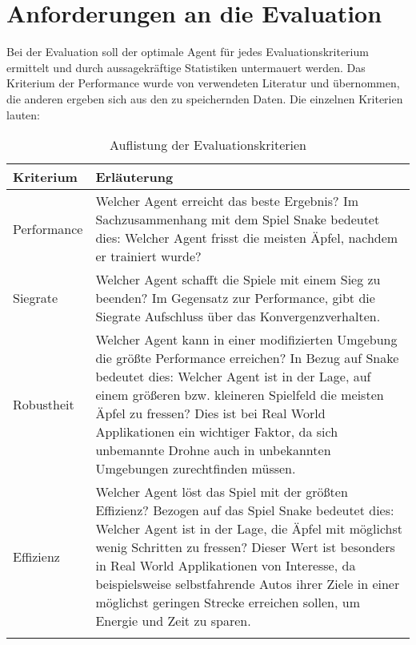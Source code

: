 \section{Anforderungen an die Evaluation} \label{sec:Anforderungen_an_die_Evaluation}
Bei der Evaluation soll der optimale Agent für jedes Evaluationskriterium ermittelt und durch aussagekräftige Statistiken untermauert werden.
Das Kriterium der Performance wurde von verwendeten Literatur \cite{Autonomous_Agents_in_Snake_Game_via_DRL} und \cite{UAV} übernommen, die anderen ergeben sich aus den zu speichernden Daten.
Die einzelnen Kriterien lauten:
\begin{longtable}[h]{|p{4cm}|p{\linewidth - 5cm}|}
	\hline
	Kriterium & Erläuterung \\
	\hline
	Performance & Welcher Agent erreicht das beste Ergebnis? Im Sachzusammenhang mit dem Spiel Snake bedeutet dies: Welcher Agent frisst die meisten Äpfel, nachdem er trainiert wurde?\\
	\hline
	Siegrate & Welcher Agent schafft die Spiele mit einem Sieg zu beenden? Im Gegensatz zur Performance, gibt die Siegrate Aufschluss über das Konvergenzverhalten.\\
	\hline
	Robustheit & Welcher Agent kann in einer modifizierten Umgebung die größte Performance erreichen? In Bezug auf Snake bedeutet dies: Welcher Agent ist in der Lage, auf einem größeren bzw. kleineren Spielfeld die meisten Äpfel zu fressen? Dies ist bei Real World Applikationen ein wichtiger Faktor, da sich unbemannte Drohne auch in unbekannten Umgebungen zurechtfinden müssen.\\
	\hline
	Effizienz & Welcher Agent löst das Spiel mit der größten Effizienz? Bezogen auf das Spiel Snake bedeutet dies: Welcher Agent ist in der Lage, die Äpfel mit möglichst wenig Schritten zu fressen? Dieser Wert ist besonders in Real World Applikationen von Interesse, da beispielsweise selbstfahrende Autos ihrer Ziele in einer möglichst geringen Strecke erreichen sollen, um Energie und Zeit zu sparen.\\
	\hline
	\caption{Auflistung der Evaluationskriterien}
	\label{tab:Anforderungen_Kriterien} 
\end{longtable}